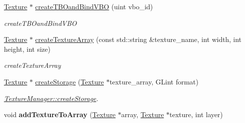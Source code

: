 \begin{DoxyCompactItemize}
\item 
\hyperlink{classEngine_1_1Texture}{Texture} $\ast$ \hyperlink{classEngine_1_1TextureManager_a42dfca28c769d9d3e03c5de414c6d99d}{create\+T\+B\+Oand\+Bind\+V\+B\+O} (uint vbo\+\_\+id)
\begin{DoxyCompactList}\small\item\em create\+T\+B\+Oand\+Bind\+V\+B\+O \end{DoxyCompactList}\item 
\hyperlink{classEngine_1_1Texture}{Texture} $\ast$ \hyperlink{classEngine_1_1TextureManager_a5025fa398f4277cfe8aa59ad80ae7290}{create\+Texture\+Array} (const std\+::string \&texture\+\_\+name, int width, int height, int size)
\begin{DoxyCompactList}\small\item\em create\+Texture\+Array \end{DoxyCompactList}\item 
\hyperlink{classEngine_1_1Texture}{Texture} $\ast$ \hyperlink{classEngine_1_1TextureManager_afa8421ea8c6067e4ceb911300c49b3a0}{create\+Storage} (\hyperlink{classEngine_1_1Texture}{Texture} $\ast$texture\+\_\+array, G\+Lint format)
\begin{DoxyCompactList}\small\item\em \hyperlink{classEngine_1_1TextureManager_afa8421ea8c6067e4ceb911300c49b3a0}{Texture\+Manager\+::create\+Storage}. \end{DoxyCompactList}\item 
\hypertarget{classEngine_1_1TextureManager_aeddae2dc468dc44874ca15d0da67e70e}{}void {\bfseries add\+Texture\+To\+Array} (\hyperlink{classEngine_1_1Texture}{Texture} $\ast$array, \hyperlink{classEngine_1_1Texture}{Texture} $\ast$texture, int layer)\label{classEngine_1_1TextureManager_aeddae2dc468dc44874ca15d0da67e70e}


\end{DoxyCompactItemize}
